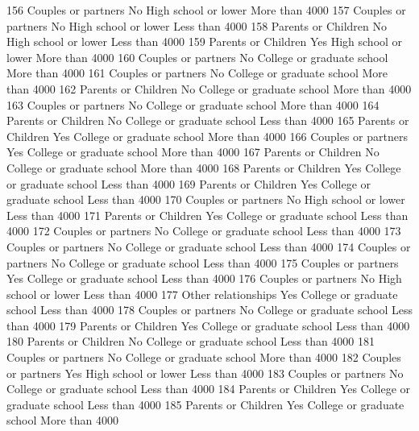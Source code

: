 \documentclass[
  letterpaper,
  DIV=11,
  numbers=noendperiod]{scrreprt}
\newenvironment{Shaded}{\begin{snugshade}}{\end{snugshade}}
\newcommand{\NormalTok}[1]{\textcolor[rgb]{0.00,0.23,0.31}{#1}}
\begin{document}
\begin{Shaded}
\begin{Highlighting}[]
\NormalTok{156 Couples or partners       No       High school or lower More than 4000}
\NormalTok{157 Couples or partners       No       High school or lower Less than 4000}
\NormalTok{158 Parents or Children       No       High school or lower Less than 4000}
\NormalTok{159 Parents or Children      Yes       High school or lower More than 4000}
\NormalTok{160 Couples or partners       No College or graduate school More than 4000}
\NormalTok{161 Couples or partners       No College or graduate school More than 4000}
\NormalTok{162 Parents or Children       No College or graduate school More than 4000}
\NormalTok{163 Couples or partners       No College or graduate school More than 4000}
\NormalTok{164 Parents or Children       No College or graduate school Less than 4000}
\NormalTok{165 Parents or Children      Yes College or graduate school More than 4000}
\NormalTok{166 Couples or partners      Yes College or graduate school More than 4000}
\NormalTok{167 Parents or Children       No College or graduate school More than 4000}
\NormalTok{168 Parents or Children      Yes College or graduate school Less than 4000}
\NormalTok{169 Parents or Children      Yes College or graduate school Less than 4000}
\NormalTok{170 Couples or partners       No       High school or lower Less than 4000}
\NormalTok{171 Parents or Children      Yes College or graduate school Less than 4000}
\NormalTok{172 Couples or partners       No College or graduate school Less than 4000}
\NormalTok{173 Couples or partners       No College or graduate school Less than 4000}
\NormalTok{174 Couples or partners       No College or graduate school Less than 4000}
\NormalTok{175 Couples or partners      Yes College or graduate school Less than 4000}
\NormalTok{176 Couples or partners       No       High school or lower Less than 4000}
\NormalTok{177 Other relationships      Yes College or graduate school Less than 4000}
\NormalTok{178 Couples or partners       No College or graduate school Less than 4000}
\NormalTok{179 Parents or Children      Yes College or graduate school Less than 4000}
\NormalTok{180 Parents or Children       No College or graduate school Less than 4000}
\NormalTok{181 Couples or partners       No College or graduate school More than 4000}
\NormalTok{182 Couples or partners      Yes       High school or lower Less than 4000}
\NormalTok{183 Couples or partners       No College or graduate school Less than 4000}
\NormalTok{184 Parents or Children      Yes College or graduate school Less than 4000}
\NormalTok{185 Parents or Children      Yes College or graduate school More than 4000}

\end{Highlighting}
\end{Shaded}
\end{document}
